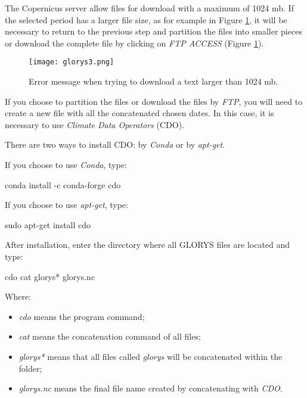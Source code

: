 \noindent The Copernicus server allow files for download with a maximum of 1024 mb. 
If the selected period has a larger file size, as for example in Figure \textcolor{bleu_cite}{\ref{glorys3}}, it will be necessary to 
return to the previous step and partition the files into smaller pieces or download the complete file by clicking on \textit{FTP ACCESS}
(Figure \textcolor{bleu_cite}{\ref{glorys3}}).
\bigskip

\begin{figure}[H]
    \centering
    \texttt{[image: glorys3.png]}
    \caption{Error message when trying to download a text larger than 1024 mb.}
    \label{glorys3}
\end{figure}
\bigskip

\noindent If you choose to partition the files or download the files by \textit{FTP}, you will need to create a new file with 
all the concatenated chosen dates. In this case, it is necessary to use \textit{Climate Data Operators} (CDO).
\bigskip

\noindent There are two ways to install CDO: by \textit{Conda} or by \textit{apt-get}.
\bigskip

\noindent If you choose to use \textit{Conda}, type:
\bigskip

\begin{bashcode}
conda install -c conda-forge cdo
\end{bashcode}
\bigskip

\noindent If you choose to use \textit{apt-get}, type:
\bigskip

\begin{bashcode}
sudo apt-get install cdo
\end{bashcode}
\bigskip

\noindent After installation, enter the directory where all GLORYS files are located and type:
\bigskip

\begin{bashcode}
cdo cat glorys* glorys.nc
\end{bashcode}
\bigskip

\noindent Where: 
\bigskip

\begin{itemize}
    \item  \textit{cdo} means the program command;
    \item \textit{cat} means the concatenation command of all files;
    \item \textit{glorys*} means that all files called \textit{glorys} will be concatenated within the folder;
    \item \textit{glorys.nc} means the final file name created by concatenating with \textit{CDO}.
\end{itemize}
\bigskip

